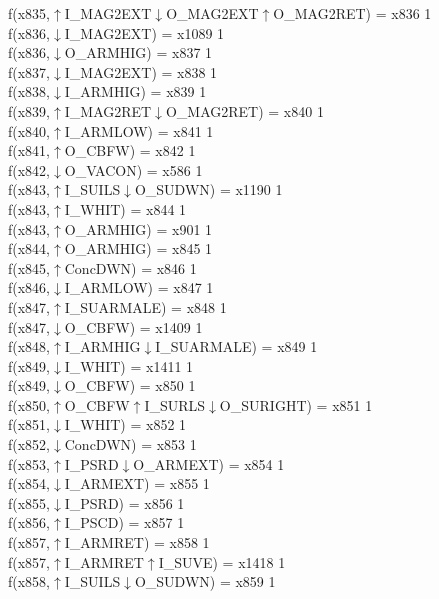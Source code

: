 f(x835,$\uparrow$I\_MAG2EXT$\downarrow$O\_MAG2EXT$\uparrow$O\_MAG2RET) = x836 {1} \\
f(x836,$\downarrow$I\_MAG2EXT) = x1089 {1} \\
f(x836,$\downarrow$O\_ARMHIG) = x837 {1} \\
f(x837,$\downarrow$I\_MAG2EXT) = x838 {1} \\
f(x838,$\downarrow$I\_ARMHIG) = x839 {1} \\
f(x839,$\uparrow$I\_MAG2RET$\downarrow$O\_MAG2RET) = x840 {1} \\
f(x840,$\uparrow$I\_ARMLOW) = x841 {1} \\
f(x841,$\uparrow$O\_CBFW) = x842 {1} \\
f(x842,$\downarrow$O\_VACON) = x586 {1} \\
f(x843,$\uparrow$I\_SUILS$\downarrow$O\_SUDWN) = x1190 {1} \\
f(x843,$\uparrow$I\_WHIT) = x844 {1} \\
f(x843,$\uparrow$O\_ARMHIG) = x901 {1} \\
f(x844,$\uparrow$O\_ARMHIG) = x845 {1} \\
f(x845,$\uparrow$ConcDWN) = x846 {1} \\
f(x846,$\downarrow$I\_ARMLOW) = x847 {1} \\
f(x847,$\uparrow$I\_SUARMALE) = x848 {1} \\
f(x847,$\downarrow$O\_CBFW) = x1409 {1} \\
f(x848,$\uparrow$I\_ARMHIG$\downarrow$I\_SUARMALE) = x849 {1} \\
f(x849,$\downarrow$I\_WHIT) = x1411 {1} \\
f(x849,$\downarrow$O\_CBFW) = x850 {1} \\
f(x850,$\uparrow$O\_CBFW$\uparrow$I\_SURLS$\downarrow$O\_SURIGHT) = x851 {1} \\
f(x851,$\downarrow$I\_WHIT) = x852 {1} \\
f(x852,$\downarrow$ConcDWN) = x853 {1} \\
f(x853,$\uparrow$I\_PSRD$\downarrow$O\_ARMEXT) = x854 {1} \\
f(x854,$\downarrow$I\_ARMEXT) = x855 {1} \\
f(x855,$\downarrow$I\_PSRD) = x856 {1} \\
f(x856,$\uparrow$I\_PSCD) = x857 {1} \\
f(x857,$\uparrow$I\_ARMRET) = x858 {1} \\
f(x857,$\uparrow$I\_ARMRET$\uparrow$I\_SUVE) = x1418 {1} \\
f(x858,$\uparrow$I\_SUILS$\downarrow$O\_SUDWN) = x859 {1} \\

